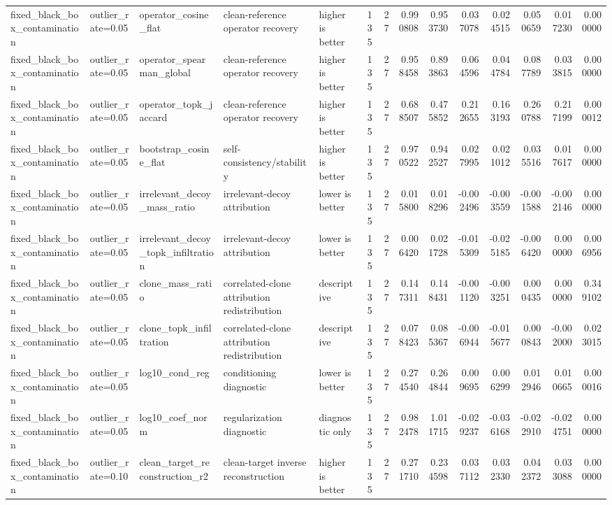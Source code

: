 \begin{table}[t]
\begin{tabular}{lllllrrrrrrrrr}
fixed_black_box_contamination & outlier_rate=0.05 & operator_cosine_flat & clean-reference operator recovery & higher is better & 135 & 27 & 0.990808 & 0.953730 & 0.037078 & 0.024515 & 0.050659 & 0.017230 & 0.000000 \\
fixed_black_box_contamination & outlier_rate=0.05 & operator_spearman_global & clean-reference operator recovery & higher is better & 135 & 27 & 0.958458 & 0.893863 & 0.064596 & 0.044784 & 0.087789 & 0.033815 & 0.000000 \\
fixed_black_box_contamination & outlier_rate=0.05 & operator_topk_jaccard & clean-reference operator recovery & higher is better & 135 & 27 & 0.688507 & 0.475852 & 0.212655 & 0.163193 & 0.260788 & 0.217199 & 0.000012 \\
fixed_black_box_contamination & outlier_rate=0.05 & bootstrap_cosine_flat & self-consistency/stability & higher is better & 135 & 27 & 0.970522 & 0.942527 & 0.027995 & 0.021012 & 0.035516 & 0.017617 & 0.000000 \\
fixed_black_box_contamination & outlier_rate=0.05 & irrelevant_decoy_mass_ratio & irrelevant-decoy attribution & lower is better & 135 & 27 & 0.015800 & 0.018296 & -0.002496 & -0.003559 & -0.001588 & -0.002146 & 0.000000 \\
fixed_black_box_contamination & outlier_rate=0.05 & irrelevant_decoy_topk_infiltration & irrelevant-decoy attribution & lower is better & 135 & 27 & 0.006420 & 0.021728 & -0.015309 & -0.025185 & -0.006420 & 0.000000 & 0.006956 \\
fixed_black_box_contamination & outlier_rate=0.05 & clone_mass_ratio & correlated-clone attribution redistribution & descriptive & 135 & 27 & 0.147311 & 0.148431 & -0.001120 & -0.003251 & 0.000435 & 0.000000 & 0.349102 \\
fixed_black_box_contamination & outlier_rate=0.05 & clone_topk_infiltration & correlated-clone attribution redistribution & descriptive & 135 & 27 & 0.078423 & 0.085367 & -0.006944 & -0.015677 & 0.000843 & -0.002000 & 0.023015 \\
fixed_black_box_contamination & outlier_rate=0.05 & log10_cond_reg & conditioning diagnostic & lower is better & 135 & 27 & 0.274540 & 0.264844 & 0.009695 & 0.006299 & 0.012946 & 0.010665 & 0.000016 \\
fixed_black_box_contamination & outlier_rate=0.05 & log10_coef_norm & regularization diagnostic & diagnostic only & 135 & 27 & 0.982478 & 1.011715 & -0.029237 & -0.036168 & -0.022910 & -0.024751 & 0.000000 \\
fixed_black_box_contamination & outlier_rate=0.10 & clean_target_reconstruction_r2 & clean-target inverse reconstruction & higher is better & 135 & 27 & 0.271710 & 0.234598 & 0.037112 & 0.032330 & 0.042372 & 0.033088 & 0.000000 \\

\end{tabular}
\end{table}
